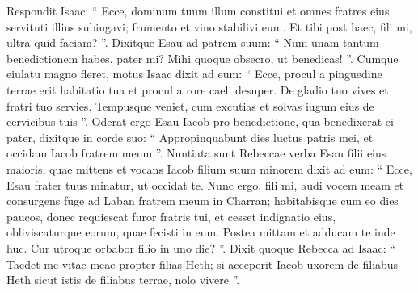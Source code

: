 \begin{biblechapter}
\begin{biblechapter}
\begin{biblechapter}
\begin{biblechapter}
\begin{biblechapter}
\begin{biblechapter}
\begin{biblechapter}
\begin{biblechapter}
\begin{biblechapter}
\begin{biblechapter}
\begin{biblechapter}
\begin{biblechapter}
\begin{biblechapter}
\begin{biblechapter}
\begin{biblechapter}
\begin{biblechapter}
\begin{biblechapter}
\begin{biblechapter}
\begin{biblechapter}
\begin{biblechapter}
\begin{biblechapter}
\begin{biblechapter}
\begin{biblechapter}
\begin{biblechapter}
\begin{biblechapter}
\begin{biblechapter}
\begin{biblechapter}
\verse Respondit Isaac: “ Ecce, dominum tuum illum constitui et omnes fratres eius servituti illius subiugavi; frumento et vino stabilivi eum. Et tibi post haec, fili mi, ultra quid faciam? ”. 
\verse Dixitque Esau ad patrem suum: “ Num unam tantum benedictionem habes, pater mi? Mihi quoque obsecro, ut benedicas! ”. Cumque eiulatu magno fleret, 
\verse motus Isaac dixit ad eum:
 “ Ecce, procul a pinguedine terrae erit habitatio tua
 et procul a rore caeli desuper.
 \verse De gladio tuo vives
 et fratri tuo servies.
 Tempusque veniet, cum excutias
 et solvas iugum eius de cervicibus tuis ”.
 \verse Oderat ergo Esau Iacob pro benedictione, qua benedixerat ei pater, dixitque in corde suo: “ Appropinquabunt dies luctus patris mei, et occidam Iacob fratrem meum ”. 
\verse Nuntiata sunt Rebeccae verba Esau filii eius maioris, quae mittens et vocans Iacob filium suum minorem dixit ad eum: “ Ecce, Esau frater tuus minatur, ut occidat te. 
\verse Nunc ergo, fili mi, audi vocem meam et consurgens fuge ad Laban fratrem meum in Charran; 
\verse habitabisque cum eo dies paucos, donec requiescat furor fratris tui, 
\verse et cesset indignatio eius, obliviscaturque eorum, quae fecisti in eum. Postea mittam et adducam te inde huc. Cur utroque orbabor filio in uno die? ”.
 \verse Dixit quoque Rebecca ad Isaac: “ Taedet me vitae meae propter filias Heth; si acceperit Iacob uxorem de filiabus Heth sicut istis de filiabus terrae, nolo vivere ”.
 

\end{biblechapter}
\end{biblechapter}
\end{biblechapter}
\end{biblechapter}
\end{biblechapter}
\end{biblechapter}
\end{biblechapter}
\end{biblechapter}
\end{biblechapter}
\end{biblechapter}
\end{biblechapter}
\end{biblechapter}
\end{biblechapter}
\end{biblechapter}
\end{biblechapter}
\end{biblechapter}
\end{biblechapter}
\end{biblechapter}
\end{biblechapter}
\end{biblechapter}
\end{biblechapter}
\end{biblechapter}
\end{biblechapter}
\end{biblechapter}
\end{biblechapter}
\end{biblechapter}
\end{biblechapter}
